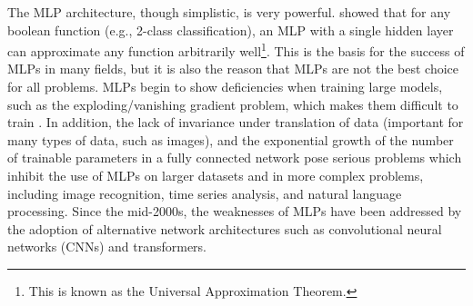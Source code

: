 The MLP architecture, though simplistic, is very powerful. \textcite{cybenko1989} showed that for any boolean 
function (e.g., 2-class classification), an MLP with a single hidden layer can 
approximate any function arbitrarily well\footnote{This is known as the Universal Approximation
Theorem.}. This is the basis for the success of MLPs in
many fields, but it is also the reason that MLPs are not the best choice for all problems.
MLPs begin to show deficiencies when training large models, such as the 
exploding/vanishing gradient problem, which makes them difficult to train \parencite{nielsen2015}. In addition, the lack of invariance under translation of data (important for many types of data, such as images), 
and the exponential growth of the number of trainable parameters in a fully connected network \parencite{Naskath2022} pose serious problems which inhibit the use of MLPs on larger datasets and in more complex problems, including 
image recognition, time series analysis, and natural language processing. Since 
the mid-2000s, the weaknesses of MLPs have been addressed by the adoption of 
alternative network architectures such as convolutional neural networks (CNNs) and
transformers.

